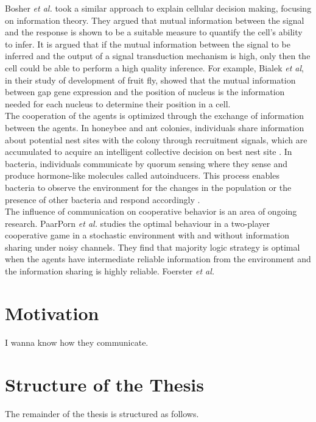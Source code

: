 Bosher \textit{et al.} \cite{Bowsher2014} took a similar approach to explain cellular decision making, focusing on information theory. They argued that mutual information between the signal and the response is shown to be a suitable measure to quantify the cell's ability to infer. It is argued that if the mutual information between the signal to be inferred and the output of a signal transduction mechanism is high, only then the cell could be able to perform a high quality inference. For example, Bialek \textit{et al}, in their study of development of fruit fly, showed that the mutual information between gap gene expression and the position of nucleus is the information needed for each nucleus to determine their position in a cell. \\
The cooperation of the agents is optimized through the exchange of information between the agents. In honeybee and ant colonies, individuals share information about potential nest sites with the colony through recruitment signals, which are accumulated to acquire an intelligent collective decision on best nest site \cite{Franks2002}. In bacteria, individuals communicate by quorum sensing where they sense and produce hormone-like molecules called autoinducers. This process enables bacteria to observe the environment for the changes in the population or the presence of other bacteria and respond accordingly \cite{doi:10.1146/annurev.cellbio.21.012704.131001}.\\
The influence of communication on cooperative behavior is an area of ongoing research. PaarPorn \textit{et al.} \cite{Paarporn2018a} studies the optimal behaviour in a two-player cooperative game in a stochastic environment with and without information sharing under noisy channels. They find that majority logic strategy is optimal when the agents have intermediate reliable information from the environment and the information sharing is highly reliable. 
Foerster \textit{et al.}

\section{Motivation}

I wanna know how they communicate.


\section{Structure of the Thesis}
The remainder of the thesis is structured as follows.

